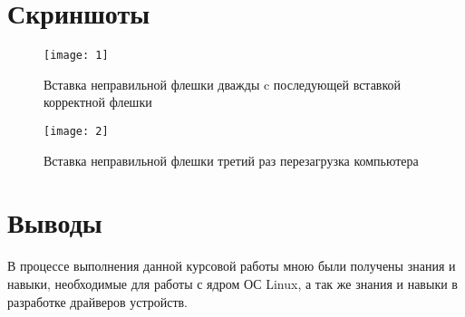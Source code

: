 \documentclass[a4paper]{article}
\begin{document}
\section{Скриншоты}
\begin{figure}[htbp]
  \centering
  \texttt{[image: 1]}
  \caption{Вставка неправильной флешки дважды c последующей вставкой корректной флешки}\label{fig:1}
\end{figure}  
\begin{figure}[htbp]
  \centering
  \texttt{[image: 2]}
  \caption{Вставка неправильной флешки третий раз перезагрузка компьютера}\label{fig:1}
\end{figure}

\section{Выводы}
	В процессе выполнения данной курсовой работы мною были получены знания и навыки, необходимые для работы с ядром ОС Linux, а так же знания и навыки в разработке драйверов устройств.
\newpage
\end{document}
